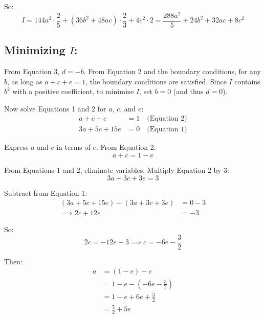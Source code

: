 \documentclass[12pt,a4paper]{article}
\theoremstyle{definition}
\begin{document}
    So:
    \begin{equation}
        I = 144a^2 \cdot \frac{2}{5} + (36b^2 + 48ac) \cdot \frac{2}{3} + 4c^2 \cdot 2 = \frac{288a^2}{5} + 24b^2 + 32ac + 8c^2
    \end{equation}

    \subsection*{Minimizing $I$:}
    From Equation 3, $d = -b$. From Equation 2 and the boundary conditions, for any $b$, as long as $a + c + e = 1$, the boundary conditions are satisfied. Since $I$ contains $b^2$ with a positive coefficient, to minimize $I$, set $b = 0$ (and thus $d = 0$).

    Now solve Equations 1 and 2 for $a$, $c$, and $e$:
    \begin{align}
        a + c + e &= 1 \quad \text{(Equation 2)} \\
        3a + 5c + 15e &= 0 \quad \text{(Equation 1)}
    \end{align}

    Express $a$ and $c$ in terms of $e$. From Equation 2:
    \begin{equation}
        a + c = 1 - e
    \end{equation}

    From Equations 1 and 2, eliminate variables. Multiply Equation 2 by 3:
    \begin{equation}
        3a + 3c + 3e = 3
    \end{equation}

    Subtract from Equation 1:
    \begin{align}
    (3a + 5c + 15e) - (3a + 3c + 3e) &= 0 - 3 \\
    \implies 2c + 12e &= -3
    \end{align}

    So:
    \begin{equation}
        2c = -12e - 3 \implies c = -6e - \frac{3}{2}
    \end{equation}

    Then:
    \begin{align}
        a &= (1 - e) - c \\
        &= 1 - e - \left(-6e - \frac{3}{2}\right) \\
        &= 1 - e + 6e + \frac{3}{2} \\
        &= \frac{5}{2} + 5e
    \end{align}
\end{document}
